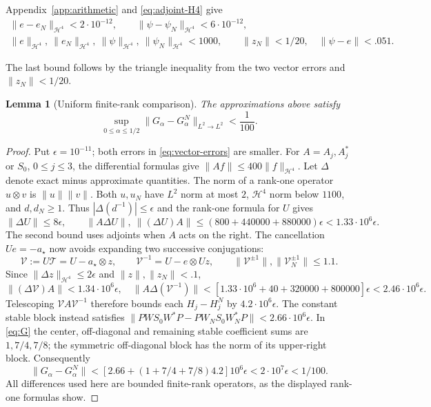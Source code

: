 \documentclass[a4paper,11pt]{article}
\numberwithin{equation}{section}
\newtheorem{lemma}[theorem]{Lemma}
\theoremstyle{definition}
\theoremstyle{remark}
\newcommand{\norm}[1]{\lVert#1\rVert}
\newcommand{\calT}{\mathcal T}
\newcommand{\avec}{a_\star}
\begin{document}
Appendix~\ref{app:arithmetic} and \eqref{eq:adjoint-H4} give
\begin{equation}\label{eq:vector-errors}
\begin{gathered}
 \norm{e-e_N}_{\mathcal H^4}<2\cdot10^{-12},\qquad
 \norm{\psi-\psi_N}_{\mathcal H^4}<6\cdot10^{-12},\\
 \norm e_{\mathcal H^4},\ \norm{e_N}_{\mathcal H^4},\
 \norm\psi_{\mathcal H^4},\ \norm{\psi_N}_{\mathcal H^4}<1000,
 \qquad \norm{z_N}<1/20,\quad \norm{\psi-e}<.051.
\end{gathered}
\end{equation}

The last bound follows by the triangle inequality from the two vector errors and $\norm{z_N}<1/20$.

\begin{lemma}[Uniform finite-rank comparison]\label{lem:comparison}
The approximations above satisfy
\begin{equation}\label{eq:comparison-small}
 \sup_{0\le\alpha\le1/2}\norm{G_\alpha-G_\alpha^N}_{L^2\to L^2}<\frac1{100}.
\end{equation}
\end{lemma}
\begin{proof}
Put $\epsilon=10^{-11}$; both errors in \eqref{eq:vector-errors} are smaller.
For $A=A_j,A_j^*$ or $S_0$, $0\le j\le3$, the differential formulas give
$\norm{Af}\le400\norm f_{\mathcal H^4}$. Let $\Delta$ denote exact minus approximate quantities. The norm of a rank-one operator $u\otimes v$ is $\norm u\norm v$. Both $u,u_N$ have $L^2$ norm at most $2$, $\mathcal H^4$ norm below $1100$, and $d,d_N\ge1$. Thus $|\Delta(d^{-1})|\le\epsilon$ and the rank-one formula for $U$ gives
\[
 \norm{\Delta U}\le8\epsilon,\qquad
 \norm{A\Delta U},\ \norm{(\Delta U)A}
 \le(800+440000+880000)\epsilon<1.33\cdot10^6\epsilon.
\]
The second bound uses adjoints when $A$ acts on the right.
The cancellation $Ue=-\avec$ now avoids expanding two successive conjugations:
\[
 \mathscr V:=U\calT=U-\avec\otimes z,\qquad
 \mathscr V^{-1}=U-e\otimes Uz,\qquad
 \norm{\mathscr V^{\pm1}},\norm{\mathscr V_N^{\pm1}}\le1.1.
\]
Since $\norm{\Delta z}_{\mathcal H^4}\le2\epsilon$ and $\norm z,\norm{z_N}<.1$,
\[
 \norm{(\Delta\mathscr V)A}<1.34\cdot10^6\epsilon,
 \quad
 \norm{A\Delta(\mathscr V^{-1})}
 <[1.33\cdot10^6+40+320000+800000]\epsilon
 <2.46\cdot10^6\epsilon.
\]
Telescoping $\mathscr VA\mathscr V^{-1}$ therefore bounds each $H_j-H_j^N$ by $4.2\cdot10^6\epsilon$. The constant stable block instead satisfies $\norm{PW S_0W^*P-PW_NS_0W_N^*P}<2.66\cdot10^6\epsilon$. In \eqref{eq:G} the center, off-diagonal and remaining stable coefficient sums are $1,7/4,7/8$; the symmetric off-diagonal block has the norm of its upper-right block. Consequently
\[
 \norm{G_\alpha-G_\alpha^N}
 <[2.66+(1+7/4+7/8)4.2]10^6\epsilon<2\cdot10^7\epsilon<1/100.
\]
All differences used here are bounded finite-rank operators, as the displayed rank-one formulas show.
\end{proof}
\end{document}
